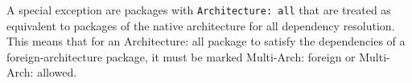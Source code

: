 A special exception are packages with \texttt{Architecture: all} that
are treated as equivalent to packages of the native architecture for
all dependency resolution. This means that for an Architecture: all
package to satisfy the dependencies of a foreign-architecture package,
it must be marked Multi-Arch: foreign or Multi-Arch: allowed. 

